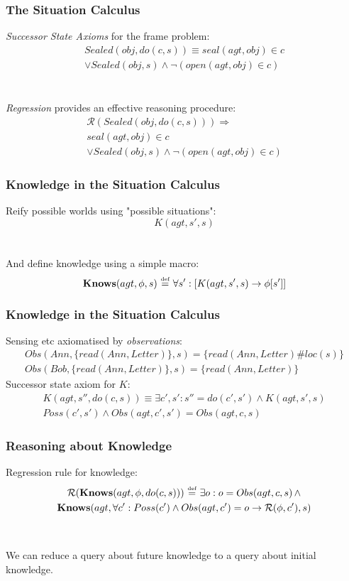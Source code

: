 \documentclass[compress]{beamer}
\newcommand{\isdef}{\hbox{$\stackrel{\mbox{\tiny def}}{=}$}}
\newcommand{\Reg}{\mathcal{R}}
\newcommand{\Knows}{\mathbf{Knows}}
\begin{document}
\begin{frame}
\frametitle{The Situation Calculus}
\emph{Successor State Axioms} for the frame problem:
\begin{multline*}
Sealed(obj,do(c,s)) \equiv seal(agt,obj) \in c \\
  \vee Sealed(obj,s) \wedge \neg\left(open(agt,obj) \in c\right)
\end{multline*}
\ \\
\ \\
\emph{Regression} provides an effective reasoning procedure:
\begin{multline*}
\Reg(Sealed(obj,do(c,s))) \Rightarrow \\
  seal(agt,obj) \in c \\
 \vee Sealed(obj,s) \wedge \neg\left(open(agt,obj) \in c\right)
\end{multline*}
\end{frame}

\begin{frame}
\frametitle{Knowledge in the Situation Calculus}
Reify possible worlds using "possible situations":
\begin{equation*}
 K(agt,s',s)
\end{equation*}
\ \\
\ \\
And define knowledge using a simple macro:
\begin{equation*}
\Knows(agt,\phi,s)\,\,\isdef\,\,\forall s': \left[ K(agt,s',s) \rightarrow \phi[s']\right]
\end{equation*}
\end{frame}

\begin{frame}
\frametitle{Knowledge in the Situation Calculus}
Sensing etc axiomatised by \emph{observations}:
\begin{gather*}
Obs(Ann,\{read(Ann,Letter)\},s) = \{read(Ann,Letter)\#loc(s)\}\\
Obs(Bob,\{read(Ann,Letter)\},s) = \{read(Ann,Letter)\}
\end{gather*}
Successor state axiom for $K$:
\begin{multline*}
K(agt,s'',do(c,s)) \equiv \exists c',s': s'' = do(c',s') \wedge K(agt,s',s)\\
  Poss(c',s') \wedge Obs(agt,c',s') = Obs(agt,c,s)
\end{multline*}
\end{frame}

\begin{frame}
\frametitle{Reasoning about Knowledge}
Regression rule for knowledge:
\begin{multline*}
\Reg(\Knows(agt,\phi,do(c,s)))\,\,\isdef\,\,\exists o: o = Obs(agt,c,s)\,\wedge \\
  \Knows(agt,\forall c': Poss(c')\wedge Obs(agt,c')=o \rightarrow \Reg(\phi,c'),s)
\end{multline*}
\ \\
\ \\
We can reduce a query about future knowledge to a query about initial knowledge.
\end{frame}
\end{document}
